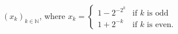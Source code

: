 $(x_k)_{k \in \mathbb{N}}$, where $x_k = \begin{cases}
  1 - 2^{-2^k} & \text{if } k \text{ is odd} \\
  1 + 2^{-k} & \text{if } k \text{ is even.}
\end{cases}$

\begin{solution}
  \ \\
\end{solution}